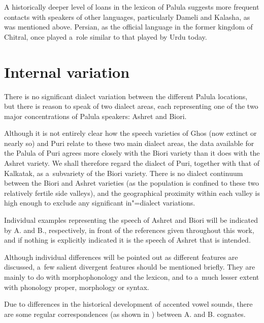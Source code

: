 A historically deeper level of loans in the lexicon of Palula suggests more frequent contacts with speakers of other languages, particularly Dameli and Kalasha, as was mentioned above. Persian, as the official language in the former kingdom of Chitral, once played a~role similar to that played by Urdu today. 


\section{Internal variation}
\label{sec:1-4}

There is no significant dialect variation between the different Palula locations, but there is reason to speak of two dialect areas, each representing one of the two major concentrations of Palula speakers: Ashret and Biori. 


Although it is not entirely clear how the speech varieties of Ghos (now extinct or nearly so) and Puri relate to these two main dialect areas, the data available for the Palula of Puri agrees more closely with the Biori variety than it does with the Ashret variety. We shall therefore regard the dialect of Puri, together with that of Kalkatak, as a~subvariety of the Biori variety. There is no dialect continuum between the Biori and Ashret varieties (as the population is confined to these two relatively fertile side valleys), and the geographical proximity within each valley is high enough to exclude any significant in"=dialect variations. 


Individual examples representing the speech of Ashret and Biori will be indicated by A. and B., respectively, in front of the references given throughout this work, and if nothing is explicitly indicated it is the speech of Ashret that is intended.


Although individual differences will be pointed out as different features are discussed, a~few salient divergent features should be mentioned briefly. They are mainly to do with morphophonology and the lexicon, and to a~much lesser extent with phonology proper, morphology or syntax.


Due to differences in the historical development of accented vowel sounds, there are some regular correspondences (as shown in ) between A. and B. cognates.


